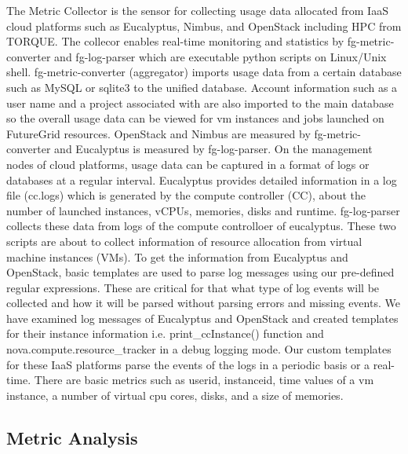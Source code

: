 \documentclass{sig-alternate-05-2015}
\begin{document}
The Metric Collector is the sensor for collecting usage data allocated from IaaS cloud platforms such as Eucalyptus, Nimbus, and OpenStack including HPC from TORQUE. The collecor enables real-time monitoring and statistics by fg-metric-converter and fg-log-parser which are executable python scripts on Linux/Unix shell. fg-metric-converter (aggregator) imports usage data from a certain database such as MySQL or sqlite3 to the unified database. Account information such as a user name and a project associated with are also imported to the main database so the overall usage data can be viewed for vm instances and jobs launched on FutureGrid resources. OpenStack and Nimbus are measured by fg-metric-converter and Eucalyptus is measured by fg-log-parser. On the management nodes of cloud platforms, usage data can be captured in a format of logs or databases at a regular interval. Eucalyptus provides detailed information in a log file (cc.logs) which is generated by the compute controller (CC), about the number of launched instances, vCPUs, memories, disks and runtime. fg-log-parser collects these data from logs of the compute controlloer of eucalyptus. These two scripts are about to collect information of resource allocation from virtual machine instances (VMs). To get the information from Eucalyptus and OpenStack, basic templates are used to parse log messages using our pre-defined regular expressions. These are critical for that what type of log events will be collected and how it will be parsed without parsing errors and missing events. We have examined log messages of Eucalyptus and OpenStack and created templates for their instance information i.e. print\_ccInstance() function and nova.compute.resource\_tracker in a debug logging mode. Our custom templates for these IaaS platforms parse the events of the logs in a periodic basis or a real-time. There are basic metrics such as userid, instanceid, time values of a vm instance, a number of virtual cpu cores, disks, and a size of memories.

\subsection{Metric Analysis}
\end{document}
